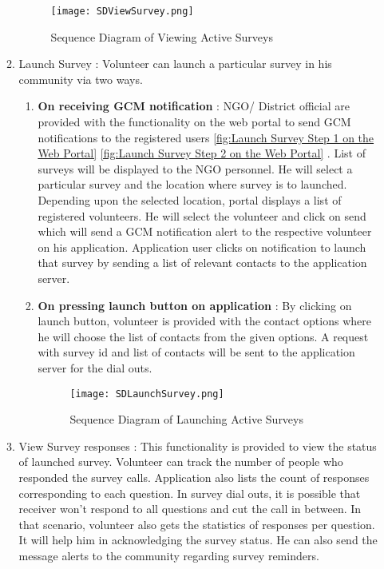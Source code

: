 \begin{itemize}
\begin{enumerate}
\begin{figure}[H]
    \centering
	\texttt{[image: SDViewSurvey.png]}
    \caption{ Sequence Diagram of Viewing Active Surveys}
    \label{fig:Sequence Diagram of Viewing Active Surveys}
\end{figure}

	\item{Launch Survey} : Volunteer can launch a particular survey in his community via two ways.
	
\begin{enumerate}
	\item\textbf{On receiving GCM notification} : NGO/ District official are provided with the functionality on the web portal to send GCM notifications to the registered users \ref{fig:Launch Survey Step 1 on the Web Portal} \ref{fig:Launch Survey Step 2 on the Web Portal} . List of surveys will be displayed to the NGO personnel. He will select a particular survey and the location where survey is to launched. Depending upon the selected location, portal displays a list of registered volunteers. He will select the volunteer and click on send which will send a GCM notification alert to the respective volunteer on his application. Application user clicks on notification to launch that survey by sending a list of relevant contacts to the application server.


	\item\textbf{On pressing launch button on application} : By clicking on launch button, volunteer is provided with the contact options where he will choose the list of contacts from the given options. A request with survey id and list of contacts  will be sent to the application server for the dial outs.

\begin{figure}[H]
    \centering
	\texttt{[image: SDLaunchSurvey.png]}
    \caption{ Sequence Diagram of Launching Active Surveys}
    \label{fig:Sequence Diagram of Launching Active Surveys}
\end{figure}
	\end{enumerate}


\item {View Survey responses} :  This functionality is provided to view the status of launched survey. Volunteer can track the number of people who responded the survey calls. Application also lists the count of responses corresponding to each question. In survey dial outs, it is possible that receiver won’t respond to all questions and cut the call in between.  In that scenario, volunteer also gets the statistics of responses per question. It will help him in acknowledging the survey status. He can also send the message alerts to the community regarding survey reminders. 
\end{enumerate}


\end{itemize}
